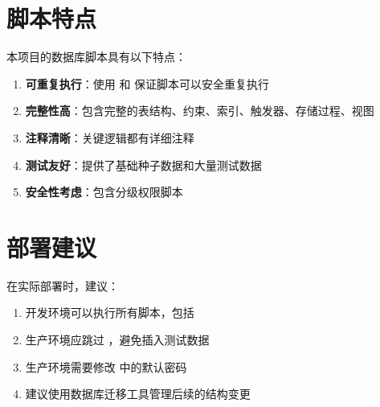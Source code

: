 \section{脚本特点}

本项目的数据库脚本具有以下特点：

\begin{enumerate}
  \item \textbf{可重复执行}：使用  和  保证脚本可以安全重复执行
  \item \textbf{完整性高}：包含完整的表结构、约束、索引、触发器、存储过程、视图
  \item \textbf{注释清晰}：关键逻辑都有详细注释
  \item \textbf{测试友好}：提供了基础种子数据和大量测试数据
  \item \textbf{安全性考虑}：包含分级权限脚本
\end{enumerate}

\section{部署建议}

在实际部署时，建议：

\begin{enumerate}
  \item 开发环境可以执行所有脚本，包括 
  \item 生产环境应跳过 ，避免插入测试数据
  \item 生产环境需要修改  中的默认密码
  \item 建议使用数据库迁移工具管理后续的结构变更
\end{enumerate}
